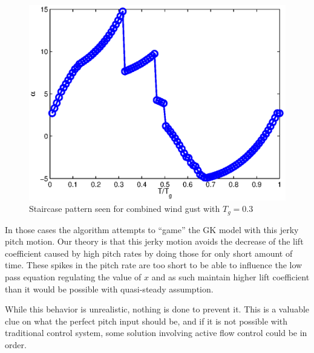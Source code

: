 \begin{figure}[h]
  \centering
  \includegraphics{./Figures/Alpha_vs_T_Windtype=3_Tg=0p3_GK_alphamax=20.eps}
  \caption{Staircase pattern seen for combined wind gust with $T_g=0.3$}
  \label{fig:staircase_case}
\end{figure}

\par In those cases the algorithm attempts to ``game'' the GK model with this jerky pitch motion.
Our theory is that this jerky motion avoids the decrease of the lift coefficient caused by high pitch rates by doing those for only short amount of time.
These spikes in the pitch rate are too short to be able to influence the low pass equation regulating the value of $x$ and as such maintain higher lift coefficient than it would be possible with quasi-steady assumption.

\par While this behavior is unrealistic, nothing is done to prevent it.
This is a valuable clue on what the perfect pitch input should be, and if it is not possible with traditional control system, some solution involving active flow control could be in order.



